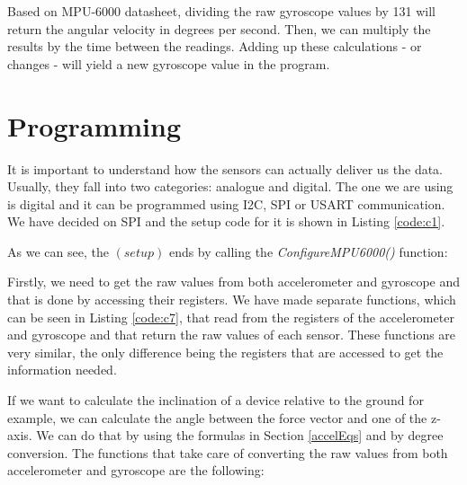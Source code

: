 Based on MPU-6000 datasheet\cite{MPU6000}, dividing the raw gyroscope values by 131 will return the angular velocity in degrees per second. Then, we can multiply the results by the time between the readings. Adding up these calculations - or changes - will yield a new gyroscope value in the program.

\section{Programming}
It is important to understand how the sensors can actually deliver us the data. Usually, they fall into two categories: analogue and digital. The one we are using is digital and it can be programmed using I2C, SPI or USART communication. We have decided on SPI and the setup code for it is shown in Listing \ref{code:c1}.
\clearpage


As we can see, the $(setup)$ ends by calling the \textit{ConfigureMPU6000()} function:


\clearpage
Firstly, we need to get the raw values from both accelerometer and gyroscope and that is done by accessing their registers. We have made separate functions, which can be seen in Listing \ref{code:c7}, that read from the registers of the accelerometer and gyroscope and that return the raw values of each sensor. These functions are very similar, the only difference being the registers that are accessed to get the information needed. 



If we want to calculate the inclination of a device relative to the ground for example, we can calculate the angle between the force vector and one of the z-axis. We can do that by using the formulas in Section \ref{accelEqs} and by degree conversion. The functions that take care of converting the raw values from both accelerometer and gyroscope are the following:



